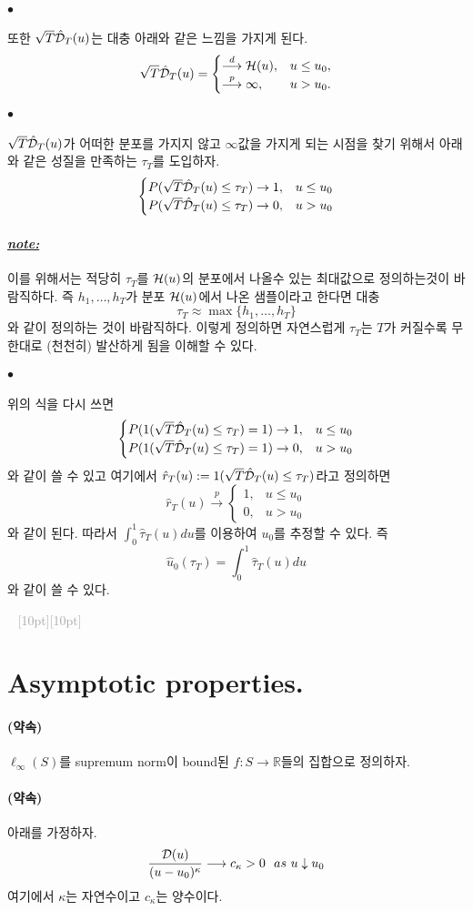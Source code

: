 \documentclass[12pt,oneside,english]{book}
\newcommand{\dash}{\vspace{2em}\noindent \textcolor{darkgray}{\hrulefill~ \raisebox{-2.5pt}[10pt][10pt]{\leafright \decofourleft \decothreeleft  \aldineright \decotwo \floweroneleft \decoone   \floweroneright \decotwo \aldineleft\decothreeright \decofourright \leafleft} ~  \hrulefill \\ \vspace{2em}}}
\def\ck{\paragraph{\large$\bullet$}\large}
\def\promise{\paragraph{\large(약속)}\large}
\def\note{\paragraph{\large\textit{\underline{note:}}}\large}
\begin{document}
\ck 또한 $\sqrt{T}\hat{\cal D}_T(u)$는 대충 아래와 같은 느낌을 가지게 된다. 
$$\sqrt{T}\hat{\cal D}_T(u)=\begin{cases}
\overset{d}{\longrightarrow} {\cal H}(u) ,& u\leq u_0, \\ 
\overset{p}{\longrightarrow} \infty, & u>u_0.
\end{cases}$$

\ck $\sqrt{T}\hat{\cal D}_T(u)$가 어떠한 분포를 가지지 않고 $\infty$값을 가지게 되는 시점을 찾기 위해서 아래와 같은 성질을 만족하는 $\tau_T$를 도입하자. 
$$\begin{cases}
P(\sqrt{T}\hat{\cal D}_T(u)\leq \tau_T) \rightarrow 1, &u\leq u_0 \\ 
P(\sqrt{T}\hat{\cal D}_T(u)\leq \tau_T) \rightarrow 0, &u > u_0
\end{cases}$$

\note 이를 위해서는 적당히 $\tau_T$를 ${\cal H}(u)$의 분포에서 나올수 있는 최대값으로 정의하는것이 바람직하다. 즉 $h_1,\dots,h_T$가 분포 ${\cal H}(u)$에서 나온 샘플이라고 한다면 대충 
$$\tau_T \approx \max\{h_1,\dots,h_T\}$$
와 같이 정의하는 것이 바람직하다. 이렇게 정의하면 자연스럽게 $\tau_T$는 $T$가 커질수록 무한대로 (천천히) 발산하게 됨을 이해할 수 있다.

\ck 위의 식을 다시 쓰면 
$$\begin{cases}
P(1(\sqrt{T}\hat{\cal D}_T(u)\leq \tau_T)=1) \rightarrow 1, &u\leq u_0 \\ 
P(1(\sqrt{T}\hat{\cal D}_T(u)\leq \tau_T)=1) \rightarrow 0, &u > u_0
\end{cases}$$
와 같이 쓸 수 있고 여기에서 $\hat{r}_T(u):=1(\sqrt{T}\hat{\cal D}_T(u)\leq \tau_T)$라고 정의하면 
$$\hat{r}_T(u) \overset{p}{\longrightarrow} \begin{cases}
1, & u\leq u_0 \\
0, & u>u_0
\end{cases}$$
와 같이 된다. 따라서 $\int_0^1\hat{\tau}_T(u)du$를 이용하여 $u_0$를 추정할 수 있다. 즉
$$\hat{u}_0(\tau_T)=\int_0^1\hat{\tau}_T(u)du$$
와 같이 쓸 수 있다. 

\dash 

\section{Asymptotic properties.}
\promise
$\ell_{\infty}(S)$를 supremum norm이 bound된 $f:S\rightarrow \mathbb{R}$들의 집합으로 정의하자. 

\promise 아래를 가정하자. 
$$\frac{{\cal D}(u)}{(u-u_0)^{\kappa}} \longrightarrow c_{\kappa} >0~~as~ u\downarrow u_0$$
여기에서 $\kappa$는 자연수이고 $c_{\kappa}$는 양수이다.
\end{document}
